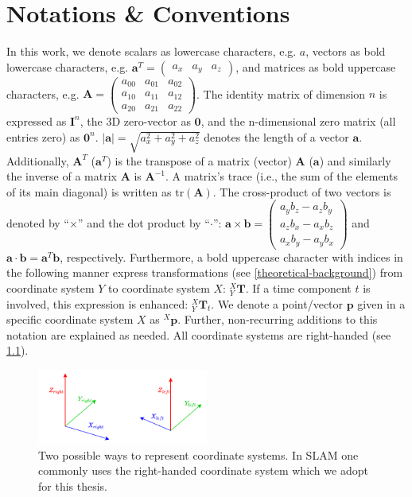 \documentclass[headsepline, hidelinks, footsepline, footinclude=false, oneside, fontsize=11pt, paper=a4, listof=totoc, bibliography=totoc]{scrbook}
\begin{document}
\chapter{Notations \& Conventions}
\label{sec:org16ce9d1}
In this work, we denote scalars as lowercase characters, e.g. \(a\), vectors as bold lowercase characters, e.g.
\(\mathbf{a}^T = \begin{pmatrix}a_x & a_y & a_z\end{pmatrix}\), and matrices as bold uppercase characters, e.g.
\(\mathbf{A} = \begin{pmatrix}a_{00} & a_{01} & a_{02} \\ a_{10} & a_{11} & a_{12} \\ a_{20} & a_{21} & a_{22}\end{pmatrix}\).
The identity matrix of dimension \(n\) is expressed as \(\mathbf{I}^n\), the 3D zero-vector as \(\mathbf{0}\), and the n-dimensional zero matrix (all entries zero) as \(\mathbf{0}^n\). 
\(|\mathbf{a}| = \sqrt{a_x^2 + a_y^2 + a_z^2}\) denotes the length of a vector \(\mathbf{a}\). 
Additionally, \(\mathbf{A}^T\) (\(\mathbf{a}^T\)) is the transpose of a matrix (vector) \(\mathbf{A}\) (\(\mathbf{a}\)) and similarly the inverse of a matrix \(\mathbf{A}\) is \(\mathbf{A}^{-1}\).
A matrix's trace (i.e., the sum of the elements of its main diagonal) is written as \(\text{tr}(\mathbf{A})\).
The cross-product of two vectors is denoted by ``\(\times\)'' and the dot product by ``\(\cdot\)'':
\(\mathbf{a} \times \mathbf{b} = \begin{pmatrix}a_yb_z - a_zb_y \\ a_zb_x - a_xb_z \\ a_xb_y - a_yb_x\end{pmatrix}\) and \(\mathbf{a} \cdot \mathbf{b} = \mathbf{a}^T\mathbf{b}\), respectively. 
Furthermore, a bold uppercase character with indices in the following manner express transformations (see \cref{theoretical-background}) from coordinate system \(Y\) to coordinate system \(X\): \({}^X_Y\mathbf{T}\). If a time component \(t\) is involved, this expression is enhanced: \({}^X_Y\mathbf{T}_t\).
We denote a point/vector \(\mathbf{p}\) given in a specific coordinate system \(X\) as \({}^X\mathbf{p}\).
Further, non-recurring additions to this notation are explained as needed.
All coordinate systems are right-handed (see \cref{fig:right-vs-left-cosy}). 

\begin{figure}[htbp]
\centering
\includegraphics[width=0.5\textwidth]{figures/right-vs-left-cosy.pdf}
\caption{\label{fig:right-vs-left-cosy}Two possible ways to represent coordinate systems. In SLAM one commonly uses the right-handed coordinate system which we adopt for this thesis.}
\end{figure}
\end{document}
